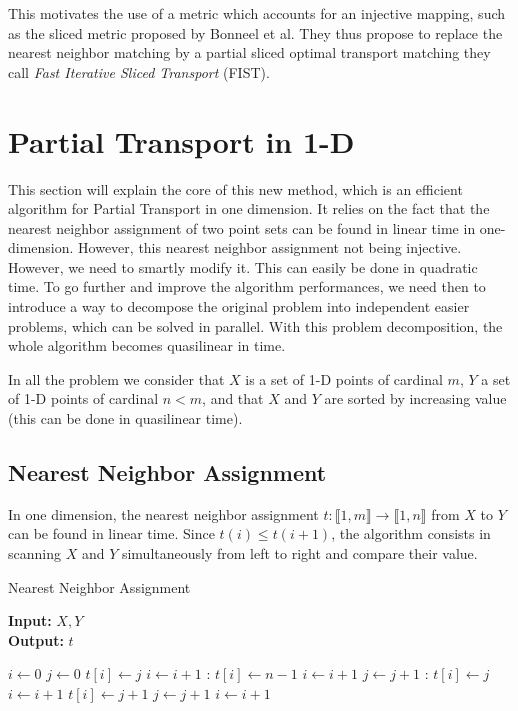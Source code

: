 \documentclass[a4paper,12pt]{article}
\begin{document}
This motivates the use of a metric which accounts for an injective mapping, such as the sliced metric proposed by Bonneel et al. They thus propose to replace the nearest neighbor matching by a partial sliced optimal transport matching they call \textit{Fast Iterative Sliced Transport} (FIST). 


\newpage

\section{Partial Transport in 1-D}

This section will explain the core of this new method, which is an efficient algorithm for Partial Transport in one dimension. It relies on the fact that the nearest neighbor assignment of two point sets can be found in linear time in one-dimension. However, this nearest neighbor assignment not being injective. However, we need to smartly modify it. This can easily be done in quadratic time. To go further and improve the algorithm performances, we need then to introduce a way to decompose the original problem into independent easier problems, which can be solved in parallel. With this problem decomposition, the whole algorithm becomes quasilinear in time.

In all the problem we consider that $X$ is a set of 1-D points of cardinal $m$, $Y$ a set of 1-D points of cardinal $n<m$, and that $X$ and $Y$ are sorted by increasing value (this can be done in quasilinear time).

\subsection{Nearest Neighbor Assignment}

In one dimension, the nearest neighbor assignment $t : \llbracket 1,m \rrbracket \rightarrow \llbracket 1,n \rrbracket$ from $X$ to $Y$ can be found in linear time. Since $t(i) \leqslant t(i+1)$, the algorithm consists in scanning $X$ and $Y$ simultaneously from left to right and compare their value.

\begin{algorithm}
\caption{Nearest Neighbor Assignment}\label{t}
\hspace*{\algorithmicindent} \textbf{Input:} $X,Y$\\
\hspace*{\algorithmicindent} \textbf{Output:} $t$ 
\begin{algorithmic}[1]
\State $i\gets 0$
\State $j\gets 0$
		\State $t[i] \gets j$
		\State $i \gets i+1$
    :
        \State $t[i] \gets n-1$
        \State $i \gets i+1$
        \State $j \gets j+1$
    :
        \State $t[i] \gets j$
        \State $i \gets i+1$
    \Else
        \State $t[i] \gets j+1$
        \State $j \gets j+1$
        \State $i \gets i+1$
    \EndIf
\EndWhile
\end{algorithmic}
\end{algorithm}
\end{document}
